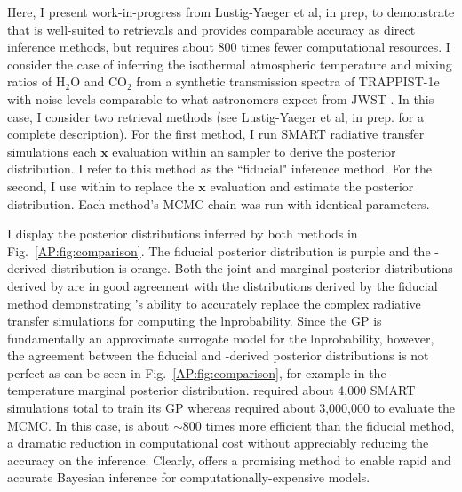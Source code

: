 Here, I present work-in-progress from Lustig-Yaeger et al, in prep, to demonstrate that \approxposterior is well-suited to retrievals and provides comparable accuracy as direct inference methods, but requires about 800 times fewer computational resources. I consider the case of inferring the isothermal atmospheric temperature and mixing ratios of H$_2$O and CO$_2$ from a synthetic transmission spectra of TRAPPIST-1e with noise levels comparable to what astronomers expect from JWST \citep{Lincowski2018}. In this case, I consider two retrieval methods (see Lustig-Yaeger et al, in prep. for a complete description). For the first method, I run SMART radiative transfer simulations each $\textbf{x}$ evaluation within an \emcee sampler to derive the posterior distribution. I refer to this method as the ``fiducial" inference method. For the second, I use \approxposterior within \emcee to replace the $\textbf{x}$ evaluation and estimate the posterior distribution. Each method's MCMC chain was run with identical parameters. 

I display the posterior distributions inferred by both methods in Fig.~\ref{AP:fig:comparison}. The fiducial posterior distribution is purple and the \approxposterior-derived distribution is orange. Both the joint and marginal posterior distributions derived by \approxposterior are in good agreement with the distributions derived by the fiducial method demonstrating \approxposterior's ability to accurately replace the complex radiative transfer simulations for computing the lnprobability. Since the \approxposterior GP is fundamentally an approximate surrogate model for the lnprobability, however, the agreement between the fiducial and \approxposterior-derived posterior distributions is not perfect as can be seen in Fig.~\ref{AP:fig:comparison}, for example in the temperature marginal posterior distribution. \approxposterior required about 4,000 SMART simulations total to train its GP whereas \emcee required about 3,000,000 to evaluate the MCMC. In this case, \approxposterior is about ${\sim}800$ times more efficient than the fiducial method, a dramatic reduction in computational cost without appreciably reducing the accuracy on the inference. Clearly, \approxposterior offers a promising method to enable rapid and accurate Bayesian inference for computationally-expensive models.

